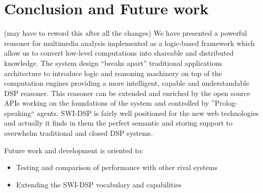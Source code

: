 \documentclass[runningheads]{llncs}
\begin{document}


\section{Conclusion and Future work}\label{sec:conclusion}

(may have to reword this after all the changes)
We have presented a powerful reasoner for multimedia analysis implemented as a logic-based framework which allow us to convert low-level computations into shareable and distributed knowledge. The system design ``breaks apart'' traditional applications architecture to introduce logic and reasoning machinery on top of the computation engines providing a more intelligent, capable and understandable DSP reasoner. This reasoner can be extended and enriched by the open source APIs working on the foundations of the system and controlled by ''Prolog-speaking`` agents. SWI-DSP is fairly well positioned for the new web technologies and actually it finds in them the perfect semantic and storing support to overwhelm traditional and closed DSP systems.

Future work and development is oriented to:

\begin{itemize}
 \item Testing and comparison of performance with other rival systems
 \item Extending the SWI-DSP vocabulary and capabilities
\end{itemize}
\end{document}
